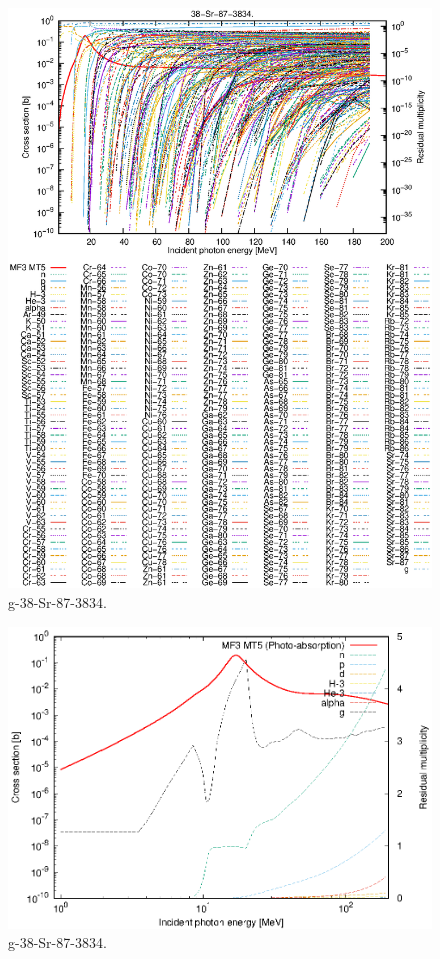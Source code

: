 \begin{figure}
 \includegraphics[width=\linewidth]{eps/g_38-Sr-87_3834.eps}
  \caption{g-38-Sr-87-3834.}
\end{figure}
\newpage \clearpage

\begin{figure}
 \includegraphics[width=\linewidth]{eps-log/g_38-Sr-87_3834.eps}
 \caption{g-38-Sr-87-3834.}
\end{figure}
\newpage \clearpage

